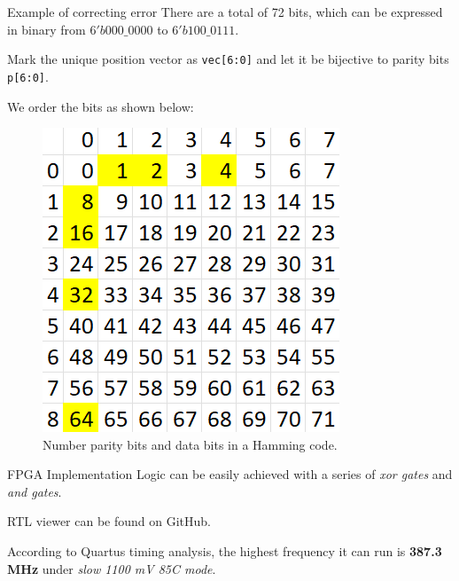 \documentclass{beamer}
\begin{document}
\begin{frame}{Example of correcting error}
    There are a total of 72 bits, which can be expressed in binary from $6'b000\_0000$ to $6'b 100\_0111$.

    Mark the unique position vector as \texttt{vec[6:0]} and let it be bijective to
    parity bits \texttt{p[6:0]}.

    We order the bits as shown below:

    \begin{figure}[htbp]
        \centerline{\includegraphics[scale = 0.6]{Images/Hamming_bits_order.png}}
        \caption{Number parity bits and data bits in a Hamming code.}
    \end{figure}
\end{frame}

\begin{frame}{FPGA Implementation}
    Logic can be easily achieved with a series of \textit{xor gates} and \textit{and gates}.

    RTL viewer can be found on GitHub.

    According to Quartus timing analysis, the highest frequency it can run is
    \textbf{387.3 MHz} under \textit{slow 1100 mV 85C mode}.
\end{frame}
\end{document}
